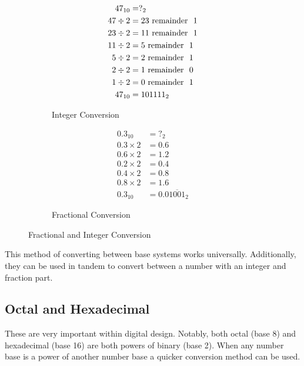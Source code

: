 \documentclass[12pt]{article}
\begin{document}
\begin{figure}[H]
  \centering
  \begin{subfigure}[b]{0.45\textwidth}
    \centering
    \begin{align*}
      47_{10} &= ?_2                    \\
      47 \div 2 &= 23 \textup{\ remainder \ } 1 \\
      23 \div 2 &= 11 \textup{\ remainder \ } 1 \\
      11 \div 2 &= 5  \textup{\ remainder \ } 1 \\
      5  \div 2 &= 2  \textup{\ remainder \ } 1 \\
      2  \div 2 &= 1  \textup{\ remainder \ } 0 \\
      1  \div 2 &= 0  \textup{\ remainder \ } 1 \\
      47_{10} &= 101111_2
    \end{align*}
    \caption{Integer Conversion}
    \label{fig:integerConversion}
  \end{subfigure}
  \begin{subfigure}[b]{0.45\textwidth}
    \centering
    \begin{align*}
      0.3_{10}     &= ?_2       \\
      0.3 \times 2 &= 0.6       \\
      0.6 \times 2 &= 1.2       \\
      0.2 \times 2 &= 0.4       \\
      0.4 \times 2 &= 0.8       \\
      0.8 \times 2 &= 1.6       \\
      0.3_{10}     &= 0.0\overline{1001}_2
    \end{align*}
    \caption{Fractional Conversion}
    \label{fig:fractionalConversion}
  \end{subfigure}
  \caption{Fractional and Integer Conversion}
  \label{fig:fractionalAndIntegerConversion}
\end{figure}

This method of converting between base systems works universally. Additionally, they can be
used in tandem to convert between a number with an integer and fraction part.

\subsection{Octal and Hexadecimal}
\label{ssec:octalAndHexadecimal}

These are very important within digital design. Notably, both octal (base 8) and hexadecimal (base 16)
are both powers of binary (base 2). When any number base is a power of another number base
a quicker conversion method can be used.
\end{document}
